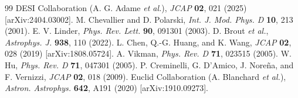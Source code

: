 \documentclass[10pt,twocolumn,a4paper]{article}
\begin{document}
\begin{thebibliography}{99}
 DESI Collaboration (A. G. Adame \textit{et al.}), \textit{JCAP} \textbf{02}, 021 (2025) [arXiv:2404.03002].
 M. Chevallier and D. Polarski, \textit{Int. J. Mod. Phys. D} \textbf{10}, 213 (2001).
 E. V. Linder, \textit{Phys. Rev. Lett.} \textbf{90}, 091301 (2003).
 D. Brout \textit{et al.}, \textit{Astrophys. J.} \textbf{938}, 110 (2022).
 L. Chen, Q.-G. Huang, and K. Wang, \textit{JCAP} \textbf{02}, 028 (2019) [arXiv:1808.05724].
 A. Vikman, \textit{Phys. Rev. D} \textbf{71}, 023515 (2005).
 W. Hu, \textit{Phys. Rev. D} \textbf{71}, 047301 (2005).
 P. Creminelli, G. D'Amico, J. Nore\~na, and F. Vernizzi, \textit{JCAP} \textbf{02}, 018 (2009).
 Euclid Collaboration (A. Blanchard \textit{et al.}), \textit{Astron. Astrophys.} \textbf{642}, A191 (2020) [arXiv:1910.09273].
\end{thebibliography}
\end{document}
